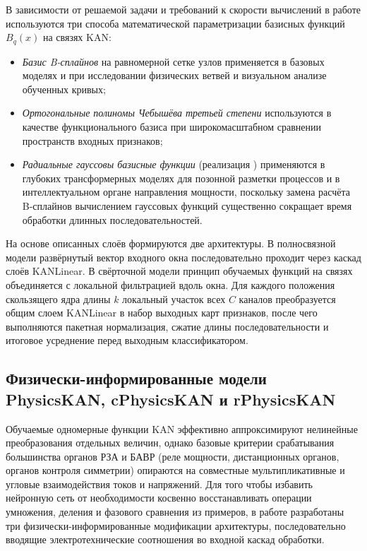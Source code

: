 В зависимости от решаемой задачи и требований к скорости вычислений в
работе используются три способа математической параметризации базисных
функций $B_q(x)$ на связях KAN:
\begin{itemize}
    \item \textit{Базис B-сплайнов} на равномерной сетке узлов применяется
    в базовых моделях  и  при исследовании
    физических ветвей и визуальном анализе обученных кривых;
    \item \textit{Ортогональные полиномы Чебышёва третьей степени}
    используются в качестве функционального базиса при широкомасштабном
    сравнении пространств входных признаков;
    \item \textit{Радиальные гауссовы базисные функции} (реализация
    ) применяются в глубоких трансформерных моделях для
    позонной разметки процессов и в интеллектуальном органе направления
    мощности, поскольку замена расчёта B-сплайнов вычислением гауссовых
    функций существенно сокращает время обработки длинных последовательностей.
\end{itemize}

На основе описанных слоёв формируются две архитектуры. В полносвязной
модели  развёрнутый вектор входного окна последовательно
проходит через каскад слоёв KANLinear. В свёрточной модели 
принцип обучаемых функций на связях объединяется с локальной фильтрацией
вдоль окна. Для каждого положения скользящего ядра длины $k$ локальный
участок всех $C$ каналов преобразуется общим слоем KANLinear в набор
выходных карт признаков, после чего выполняются пакетная нормализация,
сжатие длины последовательности и итоговое усреднение перед выходным
классификатором.

\subsection{Физически-информированные модели PhysicsKAN, cPhysicsKAN и rPhysicsKAN}
\label{sec:ch4_real_ops}
\label{sec:ch4_complex_ops}
\label{sec:ch4_relay_gate}

Обучаемые одномерные функции KAN эффективно аппроксимируют нелинейные
преобразования отдельных величин, однако базовые критерии срабатывания
большинства органов РЗА и БАВР (реле мощности, дистанционных органов,
органов контроля симметрии) опираются на совместные мультипликативные и
угловые взаимодействия токов и напряжений. Для того чтобы избавить
нейронную сеть от необходимости косвенно восстанавливать операции
умножения, деления и фазового сравнения из примеров, в работе разработаны
три физически-информированные модификации архитектуры, последовательно
вводящие электротехнические соотношения во входной каскад обработки.

